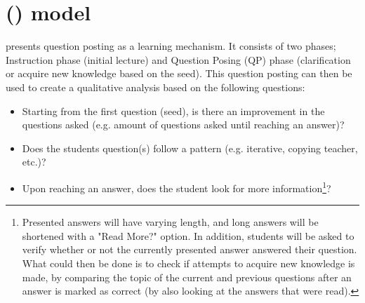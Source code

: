 \section{ () model}
\label{chapter4:qa_model}
\citet{Mishra2015} presents question posting as a learning mechanism. It consists of two phases; Instruction phase (initial lecture) and Question Posing (QP) phase 
(clarification or acquire new knowledge based on the seed). This question posting can then be used to create a qualitative analysis based on the following questions:
\begin{itemize}
	\item Starting from the first question (seed), is there an improvement in the questions asked 
	(e.g. amount of questions asked until reaching an answer)?
	\item Does the students question(s) follow a pattern (e.g. iterative, copying teacher, etc.)?
	\item Upon reaching an answer, does the student look for more information\footnote{
		Presented answers will have varying length, and long answers will be shortened with a "Read More?" option.
		In addition, students will be asked to verify whether or not the currently presented answer answered their question.
		What could then be done is to check if attempts to acquire new knowledge is made, by comparing the topic of the current 
		and previous questions after an answer is marked as correct (by also looking at the answers that were read).
		}?
\end{itemize}



